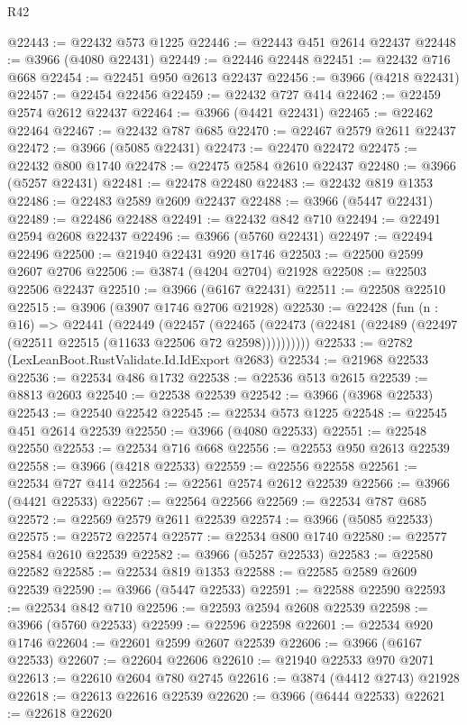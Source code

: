 \begin{lexlean}{R42}
\begin{coremodule}
@22443 := @22432 @573 @1225
@22446 := @22443 @451 @2614 @22437
@22448 := @3966 (@4080 @22431)
@22449 := @22446 @22448
@22451 := @22432 @716 @668
@22454 := @22451 @950 @2613 @22437
@22456 := @3966 (@4218 @22431)
@22457 := @22454 @22456
@22459 := @22432 @727 @414
@22462 := @22459 @2574 @2612 @22437
@22464 := @3966 (@4421 @22431)
@22465 := @22462 @22464
@22467 := @22432 @787 @685
@22470 := @22467 @2579 @2611 @22437
@22472 := @3966 (@5085 @22431)
@22473 := @22470 @22472
@22475 := @22432 @800 @1740
@22478 := @22475 @2584 @2610 @22437
@22480 := @3966 (@5257 @22431)
@22481 := @22478 @22480
@22483 := @22432 @819 @1353
@22486 := @22483 @2589 @2609 @22437
@22488 := @3966 (@5447 @22431)
@22489 := @22486 @22488
@22491 := @22432 @842 @710
@22494 := @22491 @2594 @2608 @22437
@22496 := @3966 (@5760 @22431)
@22497 := @22494 @22496
@22500 := @21940 @22431 @920 @1746
@22503 := @22500 @2599 @2607 @2706
@22506 := @3874 (@4204 @2704) @21928
@22508 := @22503 @22506 @22437
@22510 := @3966 (@6167 @22431)
@22511 := @22508 @22510
@22515 := @3906 (@3907 @1746 @2706 @21928)
@22530 := @22428
    (fun (n : @16) =>
    @22441
      (@22449
        (@22457
          (@22465 (@22473 (@22481 (@22489 (@22497 (@22511 @22515 (@11633 @22506 @72 @2598))))))))))
@22533 := @2782 (LexLeanBoot.RustValidate.Id.IdExport @2683)
@22534 := @21968 @22533
@22536 := @22534 @486 @1732
@22538 := @22536 @513 @2615
@22539 := @8813 @2603
@22540 := @22538 @22539
@22542 := @3966 (@3968 @22533)
@22543 := @22540 @22542
@22545 := @22534 @573 @1225
@22548 := @22545 @451 @2614 @22539
@22550 := @3966 (@4080 @22533)
@22551 := @22548 @22550
@22553 := @22534 @716 @668
@22556 := @22553 @950 @2613 @22539
@22558 := @3966 (@4218 @22533)
@22559 := @22556 @22558
@22561 := @22534 @727 @414
@22564 := @22561 @2574 @2612 @22539
@22566 := @3966 (@4421 @22533)
@22567 := @22564 @22566
@22569 := @22534 @787 @685
@22572 := @22569 @2579 @2611 @22539
@22574 := @3966 (@5085 @22533)
@22575 := @22572 @22574
@22577 := @22534 @800 @1740
@22580 := @22577 @2584 @2610 @22539
@22582 := @3966 (@5257 @22533)
@22583 := @22580 @22582
@22585 := @22534 @819 @1353
@22588 := @22585 @2589 @2609 @22539
@22590 := @3966 (@5447 @22533)
@22591 := @22588 @22590
@22593 := @22534 @842 @710
@22596 := @22593 @2594 @2608 @22539
@22598 := @3966 (@5760 @22533)
@22599 := @22596 @22598
@22601 := @22534 @920 @1746
@22604 := @22601 @2599 @2607 @22539
@22606 := @3966 (@6167 @22533)
@22607 := @22604 @22606
@22610 := @21940 @22533 @970 @2071
@22613 := @22610 @2604 @780 @2745
@22616 := @3874 (@4412 @2743) @21928
@22618 := @22613 @22616 @22539
@22620 := @3966 (@6444 @22533)
@22621 := @22618 @22620

\end{coremodule}
\end{lexlean}

